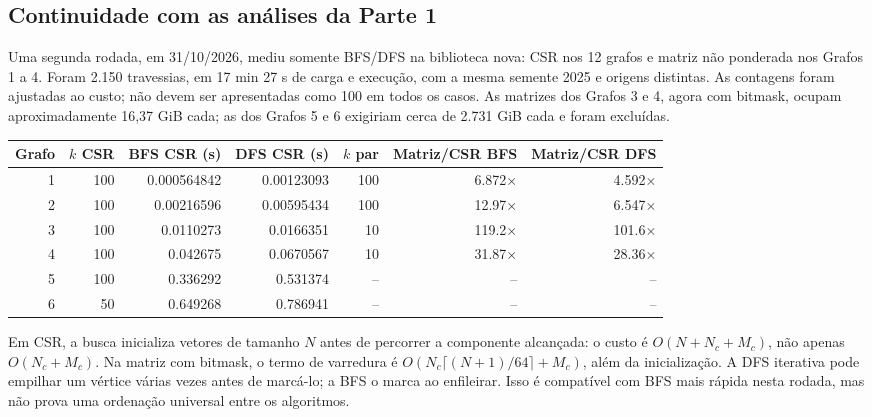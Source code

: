\documentclass[a4paper,11pt]{article}
\begin{document}
\subsection{Continuidade com as análises da Parte 1}
Uma segunda rodada, em 31/10/2026, mediu somente BFS/DFS na biblioteca nova: CSR nos 12 grafos e matriz não ponderada nos Grafos 1 a 4. Foram 2.150 travessias, em 17 min 27 s de carga e execução, com a mesma semente 2025 e origens distintas. As contagens foram ajustadas ao custo; não devem ser apresentadas como 100 em todos os casos. As matrizes dos Grafos 3 e 4, agora com bitmask, ocupam aproximadamente 16,37 GiB cada; as dos Grafos 5 e 6 exigiriam cerca de 2.731 GiB cada e foram excluídas.
\par\smallskip\noindent\begin{minipage}{\textwidth}\centering
\begingroup\fontsize{9}{11}\selectfont
\setlength{\tabcolsep}{4pt}
\begin{tabular}{rrrrrrr}
\toprule
Grafo & $k$ CSR & BFS CSR (s) & DFS CSR (s) & $k$ par & Matriz/CSR BFS & Matriz/CSR DFS \\
\midrule
1 & 100 & \num{0.000564842} & \num{0.00123093} & 100 & \num{6.872}$\times$ & \num{4.592}$\times$ \\
2 & 100 & \num{0.00216596} & \num{0.00595434} & 100 & \num{12.97}$\times$ & \num{6.547}$\times$ \\
3 & 100 & \num{0.0110273} & \num{0.0166351} & 10 & \num{119.2}$\times$ & \num{101.6}$\times$ \\
4 & 100 & \num{0.042675} & \num{0.0670567} & 10 & \num{31.87}$\times$ & \num{28.36}$\times$ \\
5 & 100 & \num{0.336292} & \num{0.531374} & -- & -- & -- \\
6 & 50 & \num{0.649268} & \num{0.786941} & -- & -- & -- \\
\bottomrule
\end{tabular}
\endgroup
{}
\end{minipage}\par\smallskip

Em CSR, a busca inicializa vetores de tamanho $N$ antes de percorrer a componente alcançada: o custo é $O(N+N_c+M_c)$, não apenas $O(N_c+M_c)$. Na matriz com bitmask, o termo de varredura é $O(N_c\lceil(N+1)/64\rceil+M_c)$, além da inicialização. A DFS iterativa pode empilhar um vértice várias vezes antes de marcá-lo; a BFS o marca ao enfileirar. Isso é compatível com BFS mais rápida nesta rodada, mas não prova uma ordenação universal entre os algoritmos.
\end{document}
